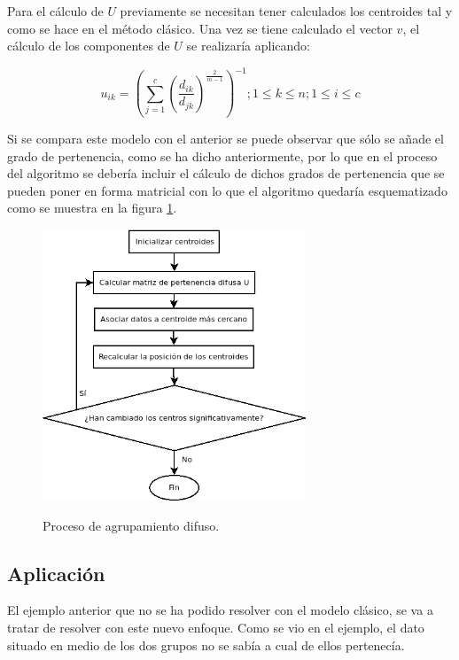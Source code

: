 \documentclass[]{report}
\begin{document}
			Para el cálculo de $U$ previamente se necesitan tener calculados los centroides tal y como se hace en el método clásico. Una vez se tiene calculado el vector $v$, el cálculo de los componentes de $U$ se realizaría aplicando:
			
			$$u_{ik} = (\sum_{j=1}^c(\frac{d _{ik}}{d_{jk}})^{\frac{2}{m-1}})^{-1} ; 1 \leq k \leq n; 1\leq i \leq c $$
		
			Si se compara este modelo con el anterior se puede observar que sólo se añade el grado de pertenencia, como se ha dicho anteriormente, por lo que en el proceso del algoritmo se debería incluir el cálculo de dichos grados de pertenencia que se pueden poner en forma matricial con lo que el algoritmo quedaría esquematizado como se muestra en la figura \ref{agrupamiento_difuso}.
			
			\begin{figure}[h]
				\centering
				\includegraphics[width=0.7\textwidth]{agrupamiento-difuso.png}
				\label{agrupamiento_difuso}
				\caption{Proceso de agrupamiento difuso.}
			\end{figure}
		
			\subsection{Aplicación}
						
				El ejemplo anterior que no se ha podido resolver con el modelo clásico, se va a tratar de resolver con este nuevo enfoque. Como se vio en el ejemplo, el dato situado en medio de los dos grupos no se sabía a cual de ellos pertenecía.\\
				
\end{document}

